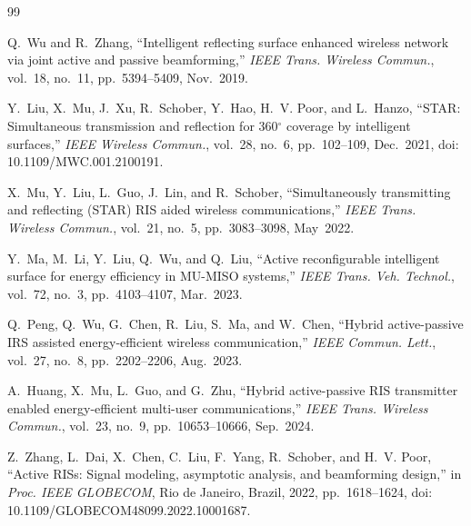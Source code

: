 \documentclass[journal]{IEEEtran}
\begin{document}
\begingroup
\renewcommand{\baselinestretch}{0.90}\selectfont
\scriptsize
\begin{thebibliography}{99}
\setlength{\itemsep}{0pt}
\setlength{\parskip}{0pt}


Q.~Wu and R.~Zhang,
``Intelligent reflecting surface enhanced wireless network via joint active and passive beamforming,''
\emph{IEEE Trans. Wireless Commun.}, vol.~18, no.~11, pp.~5394--5409, Nov.~2019.


Y.~Liu, X.~Mu, J.~Xu, R.~Schober, Y.~Hao, H.~V. Poor, and L.~Hanzo,
``STAR: Simultaneous transmission and reflection for 360$^\circ$ coverage by intelligent surfaces,''
\emph{IEEE Wireless Commun.}, vol.~28, no.~6, pp.~102--109, Dec.~2021, doi: 10.1109/MWC.001.2100191.

X.~Mu, Y.~Liu, L.~Guo, J.~Lin, and R.~Schober,
``Simultaneously transmitting and reflecting (STAR) RIS aided wireless communications,''
\emph{IEEE Trans. Wireless Commun.}, vol.~21, no.~5, pp.~3083--3098, May~2022.

Y.~Ma, M.~Li, Y.~Liu, Q.~Wu, and Q.~Liu,
``Active reconfigurable intelligent surface for energy efficiency in MU-MISO systems,''
\emph{IEEE Trans. Veh. Technol.}, vol.~72, no.~3, pp.~4103--4107, Mar.~2023.

Q.~Peng, Q.~Wu, G.~Chen, R.~Liu, S.~Ma, and W.~Chen,
``Hybrid active-passive IRS assisted energy-efficient wireless communication,''
\emph{IEEE Commun. Lett.}, vol.~27, no.~8, pp.~2202--2206, Aug.~2023.

A.~Huang, X.~Mu, L.~Guo, and G.~Zhu,
``Hybrid active-passive RIS transmitter enabled energy-efficient multi-user communications,''
\emph{IEEE Trans. Wireless Commun.}, vol.~23, no.~9, pp.~10653--10666, Sep.~2024.

Z.~Zhang, L.~Dai, X.~Chen, C.~Liu, F.~Yang, R.~Schober, and H.~V. Poor,
``Active RISs: Signal modeling, asymptotic analysis, and beamforming design,''
in \emph{Proc. IEEE GLOBECOM}, Rio de Janeiro, Brazil, 2022, pp.~1618--1624, doi: 10.1109/GLOBECOM48099.2022.10001687.


\end{thebibliography}
\end{document}
